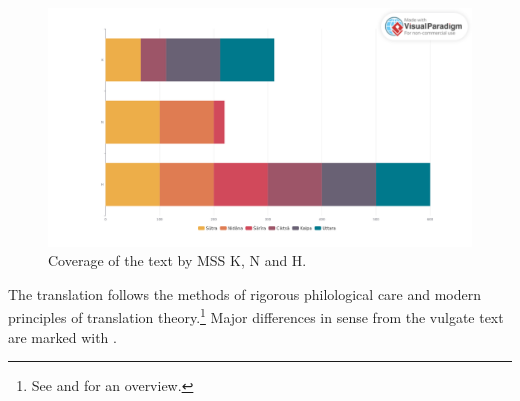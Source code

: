         \begin{figure}[t]
            \centering
            \includegraphics[width=\textwidth]{"media/MSS 1 visual paradigm.art"}
            \caption{Coverage of the text by MSS K, N and H.}
            \label{fig:mss-1-visual-paradigm}
        \end{figure}
        
    
    
The translation follows the methods of rigorous philological care and 
modern principles of translation theory.\footnote{See 
\cite[intro.]{wuja-2003} and \cite[81--83]{wuja-2021} for an overview.}  Major 
differences in sense from the vulgate text are marked with .